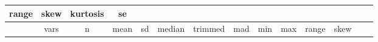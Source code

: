 \begin{longtable}[]{@{}cccccccccccccc@{}}
\begin{minipage}[b]{0.04\columnwidth}
range\strut
\end{minipage} & \begin{minipage}[b]{0.05\columnwidth}\centering\strut
skew\strut
\end{minipage} & \begin{minipage}[b]{0.06\columnwidth}\centering\strut
kurtosis\strut
\end{minipage} & \begin{minipage}[b]{0.06\columnwidth}\centering\strut
se\strut
\end{minipage}\tabularnewline
\midrule
\endfirsthead
\toprule
\begin{minipage}[b]{0.07\columnwidth}\centering\strut
~\strut
\end{minipage} & \begin{minipage}[b]{0.04\columnwidth}\centering\strut
vars\strut
\end{minipage} & \begin{minipage}[b]{0.03\columnwidth}\centering\strut
n\strut
\end{minipage} & \begin{minipage}[b]{0.05\columnwidth}\centering\strut
mean\strut
\end{minipage} & \begin{minipage}[b]{0.05\columnwidth}\centering\strut
sd\strut
\end{minipage} & \begin{minipage}[b]{0.05\columnwidth}\centering\strut
median\strut
\end{minipage} & \begin{minipage}[b]{0.05\columnwidth}\centering\strut
trimmed\strut
\end{minipage} & \begin{minipage}[b]{0.05\columnwidth}\centering\strut
mad\strut
\end{minipage} & \begin{minipage}[b]{0.03\columnwidth}\centering\strut
min\strut
\end{minipage} & \begin{minipage}[b]{0.03\columnwidth}\centering\strut
max\strut
\end{minipage} & \begin{minipage}[b]{0.04\columnwidth}\centering\strut
range\strut
\end{minipage} & \begin{minipage}[b]{0.05\columnwidth}\centering\strut
skew\strut
\end{minipage} & \begin{minipage}[b]{0.06\columnwidth}\centering\strut

\end{minipage}
\end{longtable}
